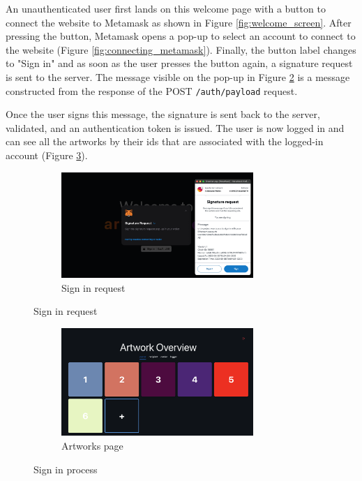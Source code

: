 An unauthenticated user first lands on this welcome page with a button to connect the website to Metamask as shown in Figure \ref{fig:welcome_screen}. After pressing the button, Metamask opens a pop-up to select an account to connect to the website (Figure \ref{fig:connecting_metamask}). Finally, the button label changes to "Sign in" and as soon as the user presses the button again, a signature request is sent to the server. The message visible on the pop-up in Figure \ref{fig:sign_in} is a message constructed from the response of the POST \texttt{/auth/payload} request.

Once the user signs this message, the signature is sent back to the server, validated, and an authentication token is issued. The user is now logged in and can see all the artworks by their \glspl{id} that are associated with the logged-in account (Figure \ref{fig:artworks_page}).

\begin{figure}[h!]
    \ContinuedFloat
    \begin{subfigure}{\textwidth}
        \centering
        \includegraphics[width=0.8\textwidth]{resources/frontend_screenshots/sign_in.png}
        \caption{Sign in request}
        \label{fig:sign_in}
        \vspace*{2mm}
    \end{subfigure}
\end{figure}

\begin{figure}[h]
    \ContinuedFloat
    \centering
    \begin{subfigure}{\textwidth}
        \centering
        \includegraphics[width=0.8\textwidth]{resources/frontend_screenshots/artworks_page.png}
        \caption{Artworks page}
        \label{fig:artworks_page}
    \end{subfigure}
    \caption{Sign in process}
    \label{fig:sign_in_process}
\end{figure}

